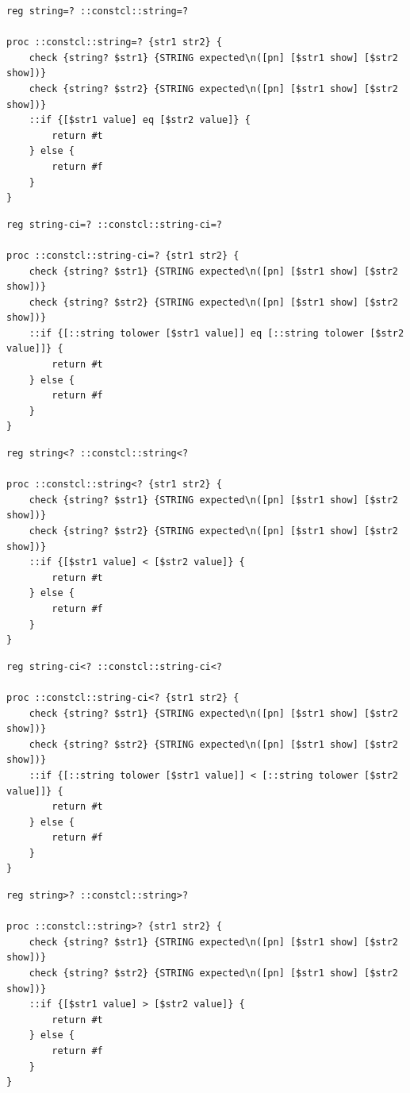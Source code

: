 \documentclass[twoside,9pt]{report}
\begin{document}
\noindent\makebox[\linewidth]{\rule{\linewidth}{0.4pt}}
\begin{lstlisting}
reg string=? ::constcl::string=?
 
proc ::constcl::string=? {str1 str2} {
    check {string? $str1} {STRING expected\n([pn] [$str1 show] [$str2 show])}
    check {string? $str2} {STRING expected\n([pn] [$str1 show] [$str2 show])}
    ::if {[$str1 value] eq [$str2 value]} {
        return #t
    } else {
        return #f
    }
}
\end{lstlisting}
\noindent\makebox[\linewidth]{\rule{\linewidth}{0.4pt}}
\noindent\makebox[\linewidth]{\rule{\linewidth}{0.4pt}}
\begin{lstlisting}
reg string-ci=? ::constcl::string-ci=?
 
proc ::constcl::string-ci=? {str1 str2} {
    check {string? $str1} {STRING expected\n([pn] [$str1 show] [$str2 show])}
    check {string? $str2} {STRING expected\n([pn] [$str1 show] [$str2 show])}
    ::if {[::string tolower [$str1 value]] eq [::string tolower [$str2 value]]} {
        return #t
    } else {
        return #f
    }
}
\end{lstlisting}
\noindent\makebox[\linewidth]{\rule{\linewidth}{0.4pt}}
\noindent\makebox[\linewidth]{\rule{\linewidth}{0.4pt}}
\begin{lstlisting}
reg string<? ::constcl::string<?
 
proc ::constcl::string<? {str1 str2} {
    check {string? $str1} {STRING expected\n([pn] [$str1 show] [$str2 show])}
    check {string? $str2} {STRING expected\n([pn] [$str1 show] [$str2 show])}
    ::if {[$str1 value] < [$str2 value]} {
        return #t
    } else {
        return #f
    }
}
\end{lstlisting}
\noindent\makebox[\linewidth]{\rule{\linewidth}{0.4pt}}
\noindent\makebox[\linewidth]{\rule{\linewidth}{0.4pt}}
\begin{lstlisting}
reg string-ci<? ::constcl::string-ci<?
 
proc ::constcl::string-ci<? {str1 str2} {
    check {string? $str1} {STRING expected\n([pn] [$str1 show] [$str2 show])}
    check {string? $str2} {STRING expected\n([pn] [$str1 show] [$str2 show])}
    ::if {[::string tolower [$str1 value]] < [::string tolower [$str2 value]]} {
        return #t
    } else {
        return #f
    }
}
\end{lstlisting}
\noindent\makebox[\linewidth]{\rule{\linewidth}{0.4pt}}
\noindent\makebox[\linewidth]{\rule{\linewidth}{0.4pt}}
\begin{lstlisting}
reg string>? ::constcl::string>?
 
proc ::constcl::string>? {str1 str2} {
    check {string? $str1} {STRING expected\n([pn] [$str1 show] [$str2 show])}
    check {string? $str2} {STRING expected\n([pn] [$str1 show] [$str2 show])}
    ::if {[$str1 value] > [$str2 value]} {
        return #t
    } else {
        return #f
    }
}
\end{lstlisting}
\end{document}

